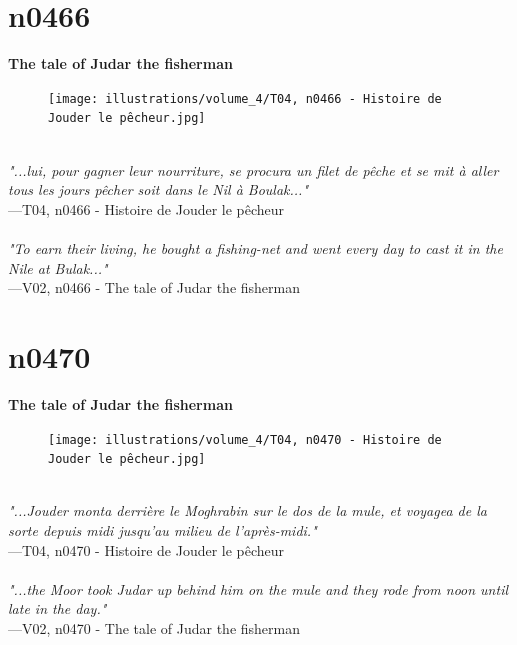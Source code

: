 \documentclass[../Carre_nights.tex]{subfiles}
\begin{document}
\newpage

\section{n0466}
\textbf{\Large{The tale of Judar the fisherman}} \\

\begin{figure}[ht]
\centering
\texttt{[image: illustrations/volume\_4/T04, n0466 - Histoire de Jouder le pêcheur.jpg]}
\end{figure}

\textit{\\
"...lui, pour gagner leur nourriture, se procura un filet de pêche et se mit à aller tous les jours pêcher soit dans le Nil à Boulak..."} \\
—T04, n0466 - Histoire de Jouder le pêcheur \\~\\
\textit{"To earn their living, he bought a fishing-net and went every day to cast it in the Nile at Bulak..."} \\
—V02, n0466 - The tale of Judar the fisherman

\newpage

\section{n0470}
\textbf{\Large{The tale of Judar the fisherman}} \\

\begin{figure}[ht]
\centering
\texttt{[image: illustrations/volume\_4/T04, n0470 - Histoire de Jouder le pêcheur.jpg]}
\end{figure}

\textit{\\
"...Jouder monta derrière le Moghrabin sur le dos de la mule, et voyagea de la sorte depuis midi jusqu’au milieu de l’après-midi."} \\
—T04, n0470 - Histoire de Jouder le pêcheur \\~\\
\textit{"...the Moor took Judar up behind him on the mule and they rode from noon until late in the day."} \\
—V02, n0470 - The tale of Judar the fisherman
\end{document}
